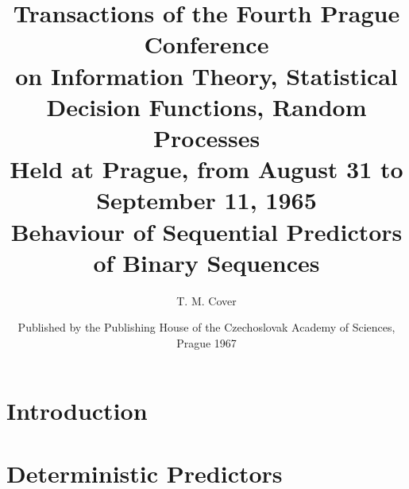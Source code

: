 \documentclass[11pt]{article}
\title{
    \Huge Transactions of the Fourth Prague Conference\\
    \Large on Information Theory, Statistical Decision Functions, Random Processes \\
    \large Held at Prague, from August 31 to September 11, 1965 \\
    \vspace{10pt}
    \normalsize Behaviour of Sequential Predictors of Binary Sequences
}
\author{T. M. Cover}
\date{Published by the Publishing House of the Czechoslovak Academy of Sciences, Prague 1967}
\numberwithin{equation}{section}
\theoremstyle{boldStyle}
\begin{document}
\maketitle

\section{Introduction}


\section{Deterministic Predictors}
\end{document}
